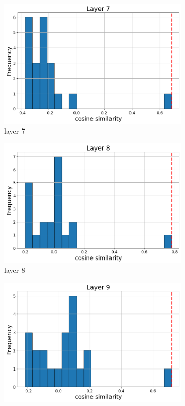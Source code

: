 \documentclass[11pt]{article}
\begin{document}
\begin{figure}[t]
    \begin{subfigure}[t]{0.24\textwidth}
    \centering
    \includegraphics[width=1.4\columnwidth]{figures/obs2_appendix/obs2_layer7.png}
    \caption{layer 7}
  \end{subfigure}\hfill
      \begin{subfigure}[t]{0.24\textwidth}
    \centering
    \includegraphics[width=1.4\columnwidth]{figures/obs2_appendix/obs2_layer8.png}
    \caption{layer 8}
  \end{subfigure}\hfill
      \begin{subfigure}[t]{0.24\textwidth}
    \centering
    \includegraphics[width=1.4\columnwidth]{figures/obs2_appendix/obs2_layer9.png}

\end{subfigure}
\end{figure}
\end{document}
